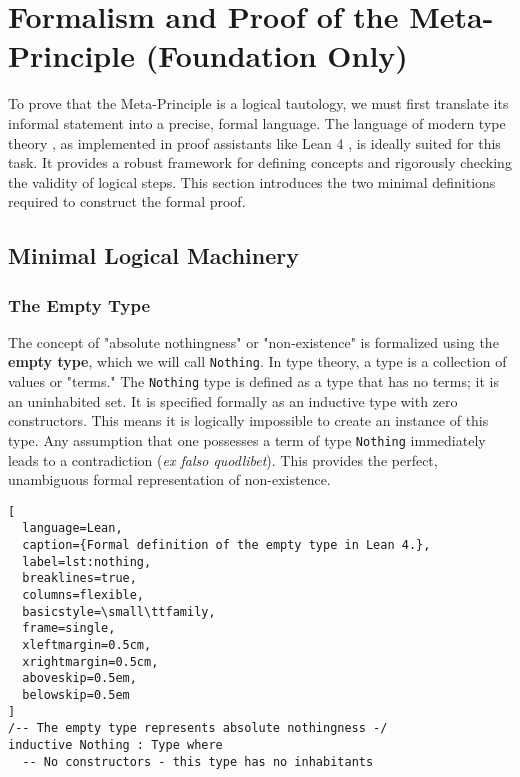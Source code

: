 \documentclass[axioms,article,submit,pdftex,oneauthor]{Definitions/mdpi}
\begin{document}
\section{Formalism and Proof of the Meta-Principle (Foundation Only)}

To prove that the Meta-Principle is a logical tautology, we must first translate its informal statement into a precise, formal language. The language of modern type theory \cite{martin1984intuitionistic, hottbook}, as implemented in proof assistants like Lean 4 \cite{de2015lean}, is ideally suited for this task. It provides a robust framework for defining concepts and rigorously checking the validity of logical steps. This section introduces the two minimal definitions required to construct the formal proof.

\subsection{Minimal Logical Machinery}

\subsubsection{The Empty Type}
The concept of "absolute nothingness" or "non-existence" is formalized using the \textbf{empty type}, which we will call \texttt{Nothing}. In type theory, a type is a collection of values or "terms." The \texttt{Nothing} type is defined as a type that has no terms; it is an uninhabited set. It is specified formally as an inductive type with zero constructors. This means it is logically impossible to create an instance of this type. Any assumption that one possesses a term of type \texttt{Nothing} immediately leads to a contradiction (\textit{ex falso quodlibet}). This provides the perfect, unambiguous formal representation of non-existence.

\begin{lstlisting}[
  language=Lean,
  caption={Formal definition of the empty type in Lean 4.},
  label=lst:nothing,
  breaklines=true,
  columns=flexible,
  basicstyle=\small\ttfamily,
  frame=single,
  xleftmargin=0.5cm,
  xrightmargin=0.5cm,
  aboveskip=0.5em,
  belowskip=0.5em
]
/-- The empty type represents absolute nothingness -/
inductive Nothing : Type where
  -- No constructors - this type has no inhabitants
\end{lstlisting}
\end{document}
